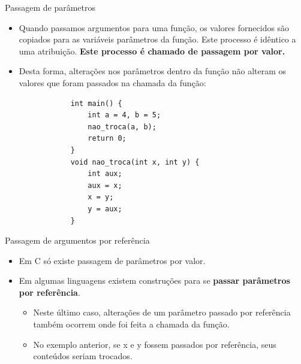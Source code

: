 \documentclass[handout]{beamer}
\begin{document}
\begin{frame}[fragile]{Passagem de parâmetros}

    \small
    \begin{itemize}[<+->]
        \item Quando passamos argumentos para uma função, os valores fornecidos
        são copiados para as variáveis parâmetros da função. Este processo é
        idêntico a uma atribuição. {\bf Este processo é chamado de passagem por valor.}
        \item Desta forma, alterações nos parâmetros dentro da função não
        alteram os valores que foram passados na chamada da função:
        \vspace{-1em}
        \begin{verbatim}
            int main() {
                int a = 4, b = 5;
                nao_troca(a, b);
                return 0;
            }
            void nao_troca(int x, int y) {
                int aux;
                aux = x;
                x = y;
                y = aux;
            }
        \end{verbatim}
    \end{itemize}

\end{frame}


\begin{frame}[fragile]{Passagem de argumentos por referência}

    \begin{itemize}
        \item Em C só existe passagem de parâmetros por valor.
        \item Em algumas linguagens existem construções para se {\bf passar parâmetros
          por referência}.
        \begin{itemize}
            \item Neste último caso, alterações de um parâmetro passado por referência
            também ocorrem onde foi feita a chamada da função.

            \item No exemplo anterior, se x e y fossem passados por referência, seus
            conteúdos seriam trocados.
        \end{itemize}
    \end{itemize}
\end{frame}
\end{document}
